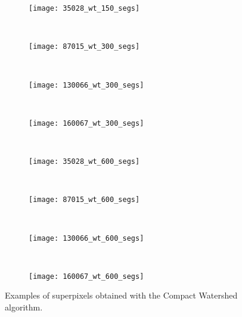 \begin{figure}[!ht]
    \begin{subfigure}[t]{\textwidth+20pt\relax}
    	\texttt{[image: 35028\_wt\_150\_segs]} 
    \end{subfigure}      
    ~ %
    \begin{subfigure}[b]{0.2\textwidth}
        \texttt{[image: 87015\_wt\_300\_segs]}
    \end{subfigure}
    ~ %
    \begin{subfigure}[b]{0.2\textwidth}
        \texttt{[image: 130066\_wt\_300\_segs]}
    \end{subfigure}
    ~ %
    \begin{subfigure}[b]{0.2\textwidth}
        \texttt{[image: 160067\_wt\_300\_segs]}
    \end{subfigure} \\ [2ex]
    
    \begin{subfigure}[t]{\textwidth+20pt\relax}
    	\texttt{[image: 35028\_wt\_600\_segs]} 
    \end{subfigure}      
    ~ %
    \begin{subfigure}[b]{0.2\textwidth}
        \texttt{[image: 87015\_wt\_600\_segs]}
    \end{subfigure}
    ~ %
    \begin{subfigure}[b]{0.2\textwidth}
        \texttt{[image: 130066\_wt\_600\_segs]}
    \end{subfigure}
    ~ %
    \begin{subfigure}[b]{0.2\textwidth}
        \texttt{[image: 160067\_wt\_600\_segs]}
    \end{subfigure}     

	\caption{Examples of superpixels obtained with the Compact Watershed algorithm.}\label{fig:wt_suprepixels}    
\end{figure}


